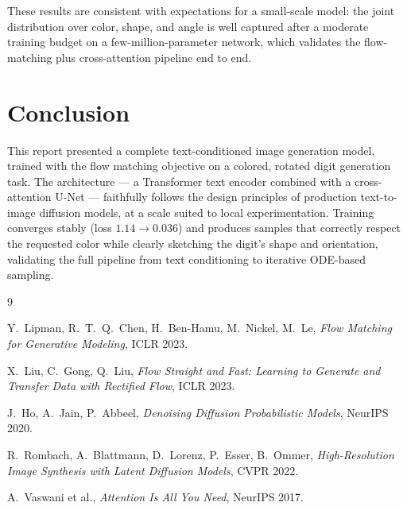 \documentclass[11pt,a4paper]{article}
\begin{document}
These results are consistent with expectations for a small-scale model: the
joint distribution over color, shape, and angle is well captured after a
moderate training budget on a few-million-parameter network, which validates
the flow-matching plus cross-attention pipeline end to end.

\section{Conclusion}

This report presented a complete text-conditioned image generation model,
trained with the flow matching objective on a colored, rotated digit
generation task. The architecture — a Transformer text encoder combined with
a cross-attention U-Net — faithfully follows the design principles of
production text-to-image diffusion models, at a scale suited to local
experimentation. Training converges stably (loss $1.14 \to 0.036$) and
produces samples that correctly respect the requested color while clearly
sketching the digit's shape and orientation, validating the full pipeline
from text conditioning to iterative ODE-based sampling.

\begin{thebibliography}{9}

Y.~Lipman, R.~T.~Q.~Chen, H.~Ben-Hamu, M.~Nickel, M.~Le,
\emph{Flow Matching for Generative Modeling}, ICLR 2023.

X.~Liu, C.~Gong, Q.~Liu,
\emph{Flow Straight and Fast: Learning to Generate and Transfer Data with
Rectified Flow}, ICLR 2023.

J.~Ho, A.~Jain, P.~Abbeel,
\emph{Denoising Diffusion Probabilistic Models}, NeurIPS 2020.

R.~Rombach, A.~Blattmann, D.~Lorenz, P.~Esser, B.~Ommer,
\emph{High-Resolution Image Synthesis with Latent Diffusion Models}, CVPR 2022.

A.~Vaswani et al., \emph{Attention Is All You Need}, NeurIPS 2017.

\end{thebibliography}
\end{document}
